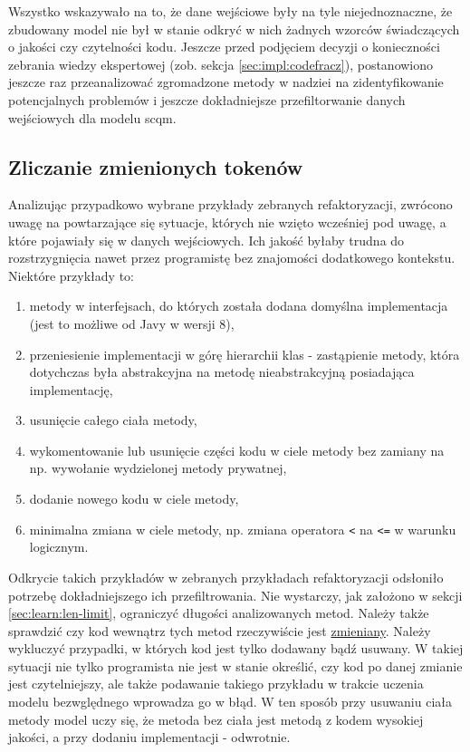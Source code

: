 \documentclass[12pt]{report}
\begin{document}
Wszystko wskazywało na to, że dane wejściowe były na tyle niejednoznaczne, że zbudowany model nie był w stanie odkryć w nich żadnych wzorców świadczących o jakości czy czytelności kodu. Jeszcze przed podjęciem decyzji o konieczności zebrania wiedzy ekspertowej (zob. sekcja \ref{sec:impl:codefracz}), postanowiono jeszcze raz przeanalizować zgromadzone metody w nadziei na zidentyfikowanie potencjalnych problemów i jeszcze dokładniejsze przefiltorwanie danych wejściowych dla modelu \gls{scqm}.

\subsection{Zliczanie zmienionych tokenów}

Analizując przypadkowo wybrane przykłady zebranych refaktoryzacji, zwrócono uwagę na powtarzające się sytuacje, których nie wzięto wcześniej pod uwagę, a które pojawiały się w danych wejściowych. Ich jakość byłaby trudna do rozstrzygnięcia nawet przez programistę bez znajomości dodatkowego kontekstu. Niektóre przykłady to:

\begin{enumerate}
\item metody w interfejsach, do których została dodana domyślna implementacja (jest to możliwe od Javy w wersji 8),
\item przeniesienie implementacji w górę hierarchii klas - zastąpienie metody, która dotychczas była abstrakcyjna na metodę nieabstrakcyjną posiadająca implementację,
\item usunięcie całego ciała metody,
\item wykomentowanie lub usunięcie części kodu w ciele metody bez zamiany na np. wywołanie wydzielonej metody prywatnej,
\item dodanie nowego kodu w ciele metody,
\item minimalna zmiana w ciele metody, np. zmiana operatora \texttt{<} na \texttt{<=} w warunku logicznym.
\end{enumerate}

Odkrycie takich przykładów w zebranych przykładach refaktoryzacji odsłoniło potrzebę dokładniejszego ich przefiltrowania. Nie wystarczy, jak założono w sekcji \ref{sec:learn:len-limit}, ograniczyć długości analizowanych metod. Należy także sprawdzić czy kod wewnątrz tych metod rzeczywiście jest \underline{zmieniany}. Należy wykluczyć przypadki, w których kod jest tylko dodawany bądź usuwany. W takiej sytuacji nie tylko programista nie jest w stanie określić, czy kod po danej zmianie jest czytelniejszy, ale także podawanie takiego przykładu w trakcie uczenia modelu bezwględnego wprowadza go w błąd. W ten sposób przy usuwaniu ciała metody model uczy się, że metoda bez ciała jest metodą z kodem wysokiej jakości, a przy dodaniu implementacji - odwrotnie.
\end{document}
